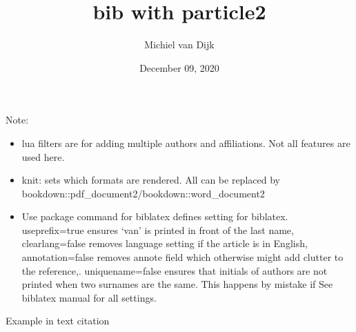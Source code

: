 \documentclass[
]{article}
\title{bib with particle2}
\author{Michiel van Dijk\textsuperscript{}}
\date{December 09, 2020}
\providecommand{\tightlist}{%
  \setlength{\itemsep}{0pt}\setlength{\parskip}{0pt}}
\begin{document}
\maketitle

Note:

\begin{itemize}
\tightlist
\item
  lua filters are for adding multiple authors and affiliations. Not all features are used here.
\item
  knit: sets which formats are rendered. All can be replaced by bookdown::pdf\_document2/bookdown::word\_document2
\item
  Use package command for biblatex defines setting for biblatex. useprefix=true ensures `van' is printed in front of the last name, clearlang=false removes language setting if the article is in English, annotation=false removes annote field which otherwise might add clutter to the reference,. uniquename=false ensures that initials of authors are not printed when two surnames are the same. This happens by mistake if See biblatex manual for all settings.
\end{itemize}

Example in text citation

\textcite{IAASTD2009}
\textcite{VanDijk2020c}
\textcite{VanVuuren2012}
\textcite{Hasegawa2014a}
\textcite{Hasegawa2018a}

\printbibliography[title=References]
\end{document}
